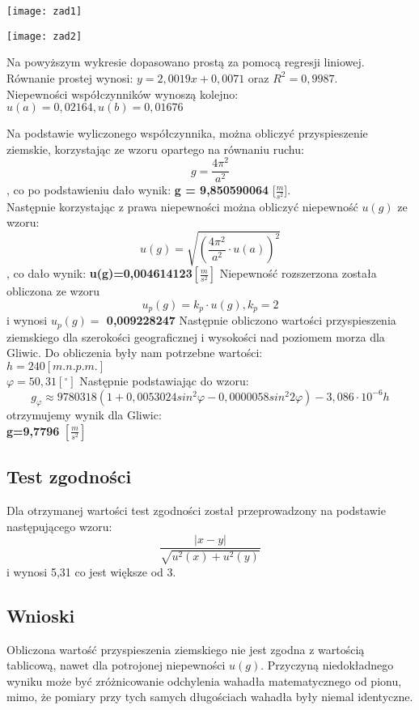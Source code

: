 \documentclass{article}
\begin{document}
\begin{small}
\begin{flushleft}
\texttt{[image: zad1]}
\end{flushleft}

\begin{flushleft}


\texttt{[image: zad2]}
\end{flushleft}

Na powyższym wykresie dopasowano prostą za pomocą regresji liniowej. Równanie prostej wynosi: $y = 2,0019x + 0,0071$ oraz $R^2 = 0,9987$. \\ Niepewności współczynników wynoszą kolejno: $u(a) = 0,02164, u(b) = 0,01676$

Na podstawie wyliczonego współczynnika, można obliczyć przyspieszenie ziemskie, korzystając ze wzoru opartego na równaniu ruchu: $$g=\frac{4\pi^2}{a^2}$$, co po podstawieniu dało wynik: \textbf{ g = 9,850590064} [$\frac{m}{s^2}$]. \\
Następnie korzystając z prawa niepewności można obliczyć niepewność $u(g)$ ze wzoru: $$u(g)=\sqrt{{(\frac{4\pi^2}{a^2}\cdot u(a))^2}}$$, co dało wynik: \textbf{u(g)=0,004614123}$[\frac{m}{s^2}]$
Niepewność rozszerzona została obliczona ze wzoru $$u_p(g)=k_p\cdot u(g),k_p=2$$ i wynosi \textbf{$u_p(g)=$ 0,009228247}
Następnie obliczono wartości przyspieszenia ziemskiego dla szerokości geograficznej i wysokości nad poziomem morza dla Gliwic. Do obliczenia były nam potrzebne wartości:\\$h=240[m.n.p.m.] $ \\ $\varphi =50,31 [^\circ]$ Następnie podstawiając do wzoru:
$$g_\varphi\approx 9780318(1+0,0053024sin^2\varphi-0,0000058sin^2 2\varphi)-3,086 \cdot10^{-6}h$$ otrzymujemy wynik dla Gliwic:  \\\textbf{g=9,7796} $[\frac{m}{s^2}]$

\subsection*{Test zgodności}
Dla otrzymanej wartości test zgodności został przeprowadzony na podstawie następującego wzoru: $$\frac{|x-y|}{\sqrt{u^2(x)+u^2(y)}}$$ i wynosi 5,31 co jest większe od 3.	
\subsection*{Wnioski}
 Obliczona wartość przyspieszenia ziemskiego nie jest zgodna z wartością tablicową, nawet dla potrojonej niepewności $u(g)$. Przyczyną niedokładnego wyniku może być zróżnicowanie odchylenia wahadła matematycznego od pionu, mimo, że pomiary przy tych samych długościach wahadła były niemal identyczne.
\end{small}
\end{document}
